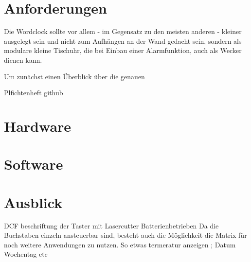 \documentclass[12pt,journal,compsoc]{IEEEtran}
\begin{document}
\section{Anforderungen}
Die Wordclock sollte vor allem - im Gegensatz zu den meisten anderen - kleiner ausgelegt sein und nicht zum Aufhängen an der Wand gedacht sein, sondern als modulare kleine Tischuhr, die bei Einbau einer Alarmfunktion, auch als Wecker dienen kann.


Um zunächst einen Überblick über die genauen 







Plfichtenheft
github

\section{Hardware}

\section{Software}

\section{Ausblick}
DCF
beschriftung der Taster mit Lasercutter
Batterienbetrieben
Da die Buchstaben  einzeln ansteuerbar sind, besteht auch die Möglichkeit die Matrix für noch weitere Anwendungen zu nutzen. So  etwas termeratur anzeigen ; Datum Wochentag etc

\nocite{*}
%
%





\end{document}
